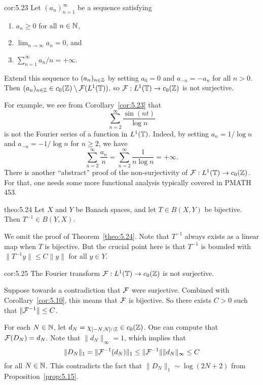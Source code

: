 \begin{cor}{cor:5.23}
    Let $(a_n)_{n=1}^\infty$ be a sequence satisfying 
    \begin{enumerate}[(1)]
        \item $a_n \geq 0$ for all $n \in \mathbb{N}$, 
        \item $\lim_{n\to\infty} a_n = 0$, and 
        \item $\sum_{n=1}^\infty a_n/n = +\infty$. 
    \end{enumerate}
    Extend this sequence to $(a_n)_{n\in\mathbb{Z}}$ by setting 
    $a_0 = 0$ and $a_{-n} = -a_n$ for all $n > 0$. Then 
    $(a_n)_{n\in\mathbb{Z}} \in c_0(\mathbb{Z}) \setminus {\cal F}(L^1(\mathbb{T}))$, so 
    ${\cal F} : L^1(\mathbb{T}) \to c_0(\mathbb{Z})$ is not surjective. 
\end{cor}

For example, we see from Corollary~\ref{cor:5.23} that 
\[ \sum_{n=2}^\infty \frac{\sin(nt)}{\log n} \] 
is not the Fourier series of a function in $L^1(\mathbb{T})$. Indeed, by setting 
$a_n = 1/\log n$ and $a_{-n} = -1/\log n$ for $n \geq 2$, we have 
\[ \sum_{n=2}^\infty \frac{a_n}{n} = \sum_{n=2}^\infty \frac{1}{n\log n} 
= +\infty. \] 
There is another ``abstract'' proof of the non-surjectivity of 
${\cal F} : L^1(\mathbb{T}) \to c_0(\mathbb{Z})$. For that, one needs some 
more functional analysis typically covered in PMATH 453. 

\begin{theo}{theo:5.24}
    Let $X$ and $Y$ be Banach spaces, and let $T \in B(X, Y)$ be 
    bijective. Then $T^{-1} \in B(Y, X)$.
\end{theo}

We omit the proof of Theorem~\ref{theo:5.24}. Note that $T^{-1}$ always 
exists as a linear map when $T$ is bijective. But the crucial point here is 
that $T^{-1}$ is bounded with $\|T^{-1}y\| \leq C\|y\|$ for all $y \in Y$. 

\begin{cor}{cor:5.25}
    The Fourier transform ${\cal F} : L^1(\mathbb{T}) \to c_0(\mathbb{Z})$ is not surjective.
\end{cor}
\begin{pf}
    Suppose towards a contradiction that ${\cal F}$ were surjective. 
    Combined with Corollary~\ref{cor:5.10}, this means that 
    ${\cal F}$ is bijective. So there exists $C > 0$ such that 
    $\|{\cal F}^{-1}\| \leq C$.

    For each $N \in \mathbb{N}$, let $d_N = \chi_{[-N,N]\cap \mathbb{Z}} \in c_0(\mathbb{Z})$. 
    One can compute that ${\cal F}(D_N) = d_N$. Note that 
    $\|d_N\|_\infty = 1$, which implies that 
    \[ \|D_N\|_1 = \|{\cal F}^{-1}(d_N)\|_1 \leq 
    \|{\cal F}^{-1}\| \|d_N\|_\infty \leq C \] 
    for all $N \in \mathbb{N}$. This contradicts the fact that $\|D_N\|_1 
    \sim \log(2N+2)$ from Proposition~\ref{prop:5.15}.
\end{pf}

